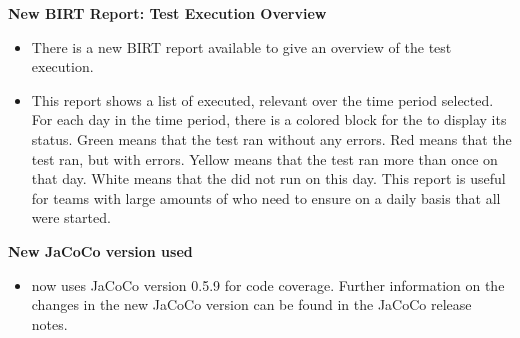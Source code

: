 \textbf{New BIRT Report: Test Execution Overview}
\begin{itemize}
\item There is a new BIRT report available to give an overview of the test execution. 
\item This report shows a list of executed, relevant \gdsuites{} over the time period selected. For each day in the time period, there is a colored block for the \gdsuite{} to display its status. Green means that the test ran without any errors. Red means that the test ran, but with errors. Yellow means that the test ran more than once on that day. White means that the \gdsuite{} did not run on this day. This report is useful for teams with large amounts of \gdsuites{} who need to ensure on a daily basis that all \gdsuites{} were started.
\end{itemize}

\textbf{New JaCoCo version used}
\begin{itemize}
\item \app{} now uses JaCoCo version 0.5.9 for code coverage. Further information on the changes in the new JaCoCo version can be found in the JaCoCo release notes.
\end{itemize}
